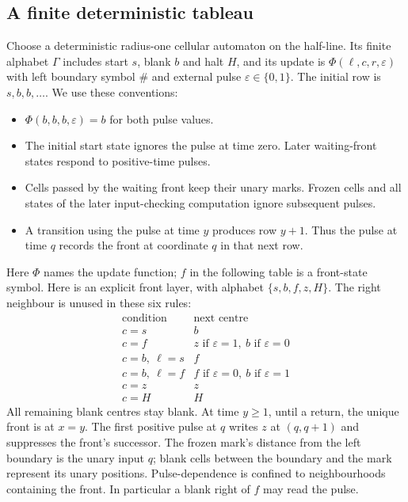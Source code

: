 \subsection{A finite deterministic tableau}
Choose a deterministic radius-one cellular automaton on the half-line. Its finite alphabet $\Gamma$ includes start $s$, blank $b$ and halt $H$, and its update is $\Phi(\ell,c,r,\varepsilon)$ with left boundary symbol $\#$ and external pulse $\varepsilon\in\{0,1\}$. The initial row is $s,b,b,\ldots$. We use these conventions:
\begin{itemize}
\item $\Phi(b,b,b,\varepsilon)=b$ for both pulse values.
\item The initial start state ignores the pulse at time zero. Later waiting-front states respond to positive-time pulses.
\item Cells passed by the waiting front keep their unary marks. Frozen cells and all states of the later input-checking computation ignore subsequent pulses.
\item A transition using the pulse at time $y$ produces row $y+1$. Thus the pulse at time $q$ records the front at coordinate $q$ in that next row.
\end{itemize}
Here $\Phi$ names the update function; $f$ in the following table is a front-state symbol. Here is an explicit front layer, with alphabet $\{s,b,f,z,H\}$.
The right neighbour is unused in these six rules:
\[
\begin{array}{c|l}
\text{condition}&\text{next centre}\\\hline
c=s&b\\
c=f&z\text{ if }\varepsilon=1,\ b\text{ if }\varepsilon=0\\
c=b,\ \ell=s&f\\
c=b,\ \ell=f&f\text{ if }\varepsilon=0,\ b\text{ if }\varepsilon=1\\
c=z&z\\
c=H&H
\end{array}
\]
All remaining blank centres stay blank. At time $y\geq1$, until a return,
the unique front is at $x=y$. The first positive pulse at $q$ writes $z$ at
$(q,q+1)$ and suppresses the front's successor. The frozen mark's distance
from the left boundary is the unary input $q$; blank cells between the
boundary and the mark represent its unary positions. Pulse-dependence is
confined to neighbourhoods containing the front. In particular a blank
right of $f$ may read the pulse.

